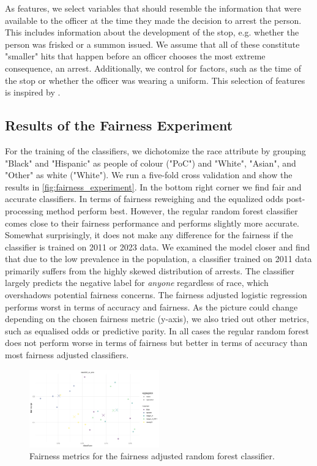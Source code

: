 As features, we select variables that should resemble the information that were available to the officer at the time they made the decision to arrest the person. This includes information about the development of the stop, e.g. whether the person was frisked or a summon issued. We assume that all of these constitute "smaller" hits that happen before an officer chooses the most extreme consequence, an arrest. Additionally, we control for factors, such as the time of the stop or whether the officer was wearing a uniform. This selection of features is inspired by \cite{Badr2022DTFANSP}.

\subsection{Results of the Fairness Experiment}
For the training of the classifiers, we dichotomize the race attribute by grouping "Black" and "Hispanic" as people of colour ("PoC") and "White", "Asian", and "Other" as white ("White"). We run a five-fold cross validation and show the results in \autoref{fig:fairness_experiment}. In the bottom right corner we find fair and accurate classifiers. In terms of fairness reweighing and the equalized odds post-processing method perform best. However, the regular random forest classifier comes close to their fairness performance and performs slightly more accurate. Somewhat surprisingly, it does not make any difference for the fairness if the classifier is trained on 2011 or 2023 data.
We examined the model closer and find that due to the low prevalence in the population, a classifier trained on 2011 data primarily suffers from the highly skewed distribution of arrests. The classifier largely predicts the negative label for \textit{anyone} regardless of race, which overshadows potential fairness concerns. The fairness adjusted logistic regression performs worst in terms of accuracy and fairness.
As the picture could change depending on the chosen fairness metric (y-axis), we also tried out other metrics, such as equalised odds or predictive parity. In all cases the regular random forest does not perform worse in terms of fairness but better in terms of accuracy than most fairness adjusted classifiers.
\begin{figure}
    \centering
    \includegraphics[width=0.5\textwidth]{../figures/sqf_case_study_plot3.png}
    \caption{Fairness metrics for the fairness adjusted random forest classifier.}
    \label{fig:fairness_experiment}
\end{figure}

